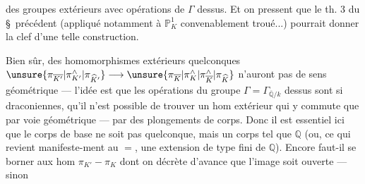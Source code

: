 des groupes  extérieurs avec opérations de $\Gamma$ dessus. Et on pressent que le th. 3 du \S\ précédent (appliqué notamment à $\mathbb P_K^1$ convenablement troué...) pourrait donner la clef d'une telle construction.

Bien  sûr, des homomorphismes extérieurs quelconques $\unsure{\pi_{\overline{K'}}|\pi^{\wedge}_{K'}|\pi_{\widehat K'}}\longrightarrow\unsure{\pi_{\overline K}|\pi^{\wedge}_K|\pi^{\wedge}_{\overline K}|\pi_{\widehat K}}$ n'auront pas de sens géométrique --- l'idée est que les opérations du groupe $\Gamma=\Gamma_{\overline{\mathbb Q}/k}$ dessus sont si draconiennes, qu'il n'est possible de trouver un hom extérieur qui y commute que par voie géométrique --- par des plongements de corps. Donc il est essentiel ici que le corps de base ne soit pas quelconque, mais un corps tel que $\mathbb Q$ (ou, ce qui revient manifeste-ment au $=$, une extension de type fini de $\mathbb Q$). Encore faut-il se borner aux hom $\pi_{K'}-\pi_K$ dont on décrète d'avance que l'image soit ouverte --- sinon
